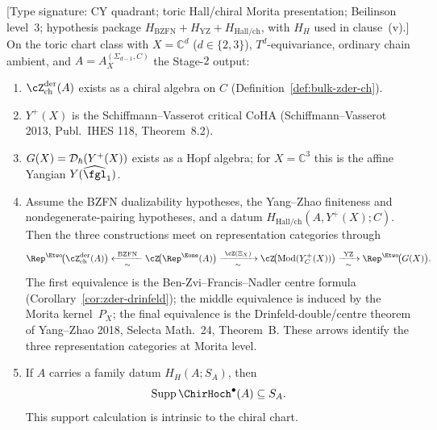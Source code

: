 \begin{theorem}
\label{thm:bulk-three-faces-coincidence}
\textup{[Type signature: CY quadrant; toric Hall/chiral Morita
presentation; Beilinson level~$3$; hypothesis package
$H_{\mathrm{BZFN}}+H_{\mathrm{YZ}}+
H_{\mathrm{Hall/ch}}$, with $H_H$ used in clause~\textup{(v)}.]}
On the toric chart class with $X = \mathbb C^d$ ($d \in \{2, 3\}$),
$T^d$-equivariance, ordinary chain ambient, and $A = A_X^{(\Sigma_{d-1},
C)}$ the Stage-$2$ output:
\begin{enumerate}[label=\textup{(\roman*)}]
\item $\cZ^{\mathrm{der}}_{\mathrm{ch}}(A)$ exists as a chiral algebra on
$C$ (Definition~\ref{def:bulk-zder-ch}).
\item $Y^{+}(X)$ is the Schiffmann--Vasserot critical CoHA
(Schiffmann--Vasserot 2013, Publ.\ IHES 118, Theorem~8.2).
\item $G(X) = \mathcal D_{\hbar}(Y^{+}(X))$ exists as a Hopf
algebra; for $X = \mathbb C^3$ this is the affine Yangian
$Y(\widehat{\fgl}_1)$.
\item Assume the BZFN dualizability hypotheses, the Yang--Zhao
finiteness and nondegenerate-pairing hypotheses, and a datum
$H_{\mathrm{Hall/ch}}(A,Y^+(X);C)$. Then the three constructions meet
on representation categories through
\[
 \Rep^{\Etwo}\!\bigl(\cZ^{\mathrm{der}}_{\mathrm{ch}}(A)\bigr)
 \xleftarrow[\sim]{\ \mathrm{BZFN}\ }
 \cZ\!\bigl(\Rep^{\Eone}(A)\bigr)
 \xrightarrow[\sim]{\ \cZ(\Xi_X)\ }
 \cZ\!\bigl(\operatorname{Mod}(Y_C^+(X))\bigr)
 \xrightarrow[\sim]{\ \mathrm{YZ}\ }
 \Rep^{\Etwo}\!\bigl(\Gquant(X)\bigr).
\]
The first equivalence is the Ben-Zvi--Francis--Nadler centre formula
(Corollary~\ref{cor:zder-drinfeld}); the middle equivalence is induced
by the Morita kernel~$P_X$; the final equivalence is the
Drinfeld-double/centre theorem of Yang--Zhao 2018, Selecta Math.\ 24,
Theorem~B. These arrows identify the three representation categories
at Morita level.
\item If $A$ carries a family datum $H_H(A;S_A)$, then
\[
 \operatorname{Supp}\ChirHoch^\bullet(A)\subseteq S_A.
\]
This support calculation is intrinsic to the chiral chart.
\end{enumerate}
\end{theorem}


